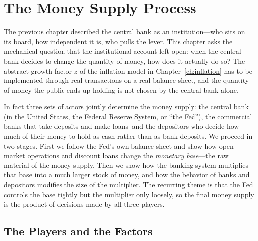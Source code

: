 \chapter{The Money Supply Process}
\label{ch:money-supply}

The previous chapter described the central bank as an institution---who sits on its board, how independent it is, who pulls the lever. This chapter asks the mechanical question that the institutional account left open: when the central bank decides to change the quantity of money, how does it actually do so? The abstract growth factor $z$ of the inflation model in Chapter~\ref{ch:inflation} has to be implemented through real transactions on a real balance sheet, and the quantity of money the public ends up holding is not chosen by the central bank alone.

In fact three sets of actors jointly determine the money supply: the central bank (in the United States, the Federal Reserve System, or ``the Fed''), the commercial banks that take deposits and make loans, and the depositors who decide how much of their money to hold as cash rather than as bank deposits. We proceed in two stages. First we follow the Fed's own balance sheet and show how open market operations and discount loans change the \emph{monetary base}---the raw material of the money supply. Then we show how the banking system multiplies that base into a much larger stock of money, and how the behavior of banks and depositors modifies the size of the multiplier. The recurring theme is that the Fed controls the base tightly but the multiplier only loosely, so the final money supply is the product of decisions made by all three players.

\section{The Players and the Factors}



